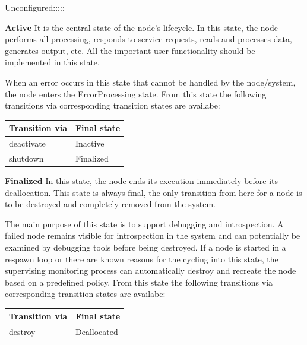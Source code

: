 \begin{labeling}{Unconfigured:::::}
		\item[\textbf{Active}] It is the central state of the node's lifecycle. In this state, the node performs all processing, responds to service requests, reads and processes data, generates output, etc. All the important user functionality should be implemented in this state.  

		When an error occurs in this state that cannot be handled by the node/system, the node enters the ErrorProcessing state. From this state the following transitions via corresponding transition states are availabe:
		\begin{table}[H]
			\centering
			\label{tab:Valid transitions}
			\begin{tabular}{|p{3cm}|p{3cm}|}
				\toprule
				Transition via & Final state\\
				\midrule
				 deactivate & Inactive  \\
				 shutdown & Finalized \\
				\bottomrule
			\end{tabular}
		\end{table}

		\item[\textbf{Finalized}] In this state, the node ends its execution immediately before its deallocation. This state is always final, the only transition from here for a node is to be destroyed and completely removed from the system.

		The main purpose of this state is to support debugging and introspection. A failed node remains visible for introspection in the system and can potentially be examined by debugging tools before being destroyed. If a node is started in a respawn loop or there are known reasons for the cycling into this state, the supervising monitoring process can automatically destroy and recreate the node based on a predefined policy. From this state the following transitions via corresponding transition states are availabe:
		\begin{table}[H]
			\centering
			\label{tab:Valid transitions}
			\begin{tabular}{|p{3cm}|p{3cm}|}
				\toprule
				Transition via & Final state\\
				\midrule
				 destroy & Deallocated  \\
				\bottomrule
			\end{tabular}
		\end{table}

	\end{labeling}

